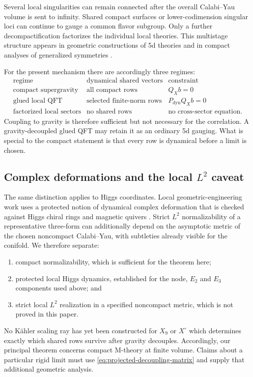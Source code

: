 Several local singularities can remain connected after the overall
Calabi--Yau volume is sent to infinity. Shared compact surfaces or
lower-codimension singular loci can continue to gauge a common flavor subgroup.
Only a further decompactification factorizes the individual local theories.
This multistage structure appears in geometric constructions of 5d theories
and in compact analyses of generalized symmetries
\cite{Apruzzi:2019vpe,Cvetic:2023plv}.

For the present mechanism there are accordingly three regimes:
\begin{equation}
\begin{array}{c|c|c}
\text{regime}&\text{dynamical shared vectors}&\text{constraint}\\
\hline
\text{compact supergravity}&\text{all compact rows}&Q_Xb=0\\
\text{glued local QFT}&\text{selected finite-norm rows}&P_{\mathrm{dyn}}Q_Xb=0\\
\text{factorized local sectors}&\text{no shared rows}&\text{no cross-sector equation}.
\end{array}
\label{eq:three-regimes}
\end{equation}
Coupling to gravity is therefore sufficient but not necessary for the
correlation. A gravity-decoupled glued QFT may retain it as an ordinary 5d
gauging. What is special to the compact statement is that every row is
dynamical before a limit is chosen.

\subsection[Complex deformations and the local L2 caveat]{Complex deformations and the local $L^2$ caveat}
\label{subsec:local-l2-caveat}

The same distinction applies to Higgs coordinates. Local geometric-engineering
work uses a protected notion of dynamical complex deformation that is checked
against Higgs chiral rings and magnetic quivers
\cite{Closset:2020afy,DeMarco:2026higgs}. Strict $L^2$ normalizability of a
representative three-form can additionally depend on the asymptotic metric of
the chosen noncompact Calabi--Yau, with subtleties already visible for the
conifold. We therefore separate:
\begin{enumerate}
 \item compact normalizability, which is sufficient for the theorem here;
 \item protected local Higgs dynamics, established for the node, $E_2$ and
 $E_3$ components used above; and
 \item strict local $L^2$ realization in a specified noncompact metric, which
 is not proved in this paper.
\end{enumerate}

No K\"ahler scaling ray has yet been constructed for $X_9$ or $X^{\circ}$
which determines exactly which shared rows survive after gravity decouples.
Accordingly, our principal theorem concerns compact M-theory at finite volume.
Claims about a particular rigid limit must use
\eqref{eq:projected-decoupling-matrix} and supply that additional geometric
analysis.
